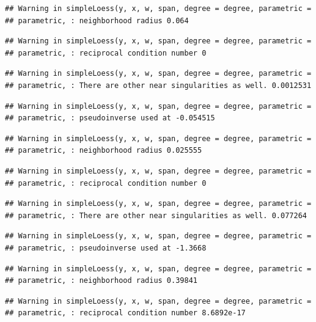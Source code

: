 \documentclass[]{article}
\begin{document}
\begin{verbatim}
## Warning in simpleLoess(y, x, w, span, degree = degree, parametric =
## parametric, : neighborhood radius 0.064
\end{verbatim}

\begin{verbatim}
## Warning in simpleLoess(y, x, w, span, degree = degree, parametric =
## parametric, : reciprocal condition number 0
\end{verbatim}

\begin{verbatim}
## Warning in simpleLoess(y, x, w, span, degree = degree, parametric =
## parametric, : There are other near singularities as well. 0.0012531
\end{verbatim}

\begin{verbatim}
## Warning in simpleLoess(y, x, w, span, degree = degree, parametric =
## parametric, : pseudoinverse used at -0.054515
\end{verbatim}

\begin{verbatim}
## Warning in simpleLoess(y, x, w, span, degree = degree, parametric =
## parametric, : neighborhood radius 0.025555
\end{verbatim}

\begin{verbatim}
## Warning in simpleLoess(y, x, w, span, degree = degree, parametric =
## parametric, : reciprocal condition number 0
\end{verbatim}

\begin{verbatim}
## Warning in simpleLoess(y, x, w, span, degree = degree, parametric =
## parametric, : There are other near singularities as well. 0.077264
\end{verbatim}

\begin{verbatim}
## Warning in simpleLoess(y, x, w, span, degree = degree, parametric =
## parametric, : pseudoinverse used at -1.3668
\end{verbatim}

\begin{verbatim}
## Warning in simpleLoess(y, x, w, span, degree = degree, parametric =
## parametric, : neighborhood radius 0.39841
\end{verbatim}

\begin{verbatim}
## Warning in simpleLoess(y, x, w, span, degree = degree, parametric =
## parametric, : reciprocal condition number 8.6892e-17
\end{verbatim}
\end{document}
